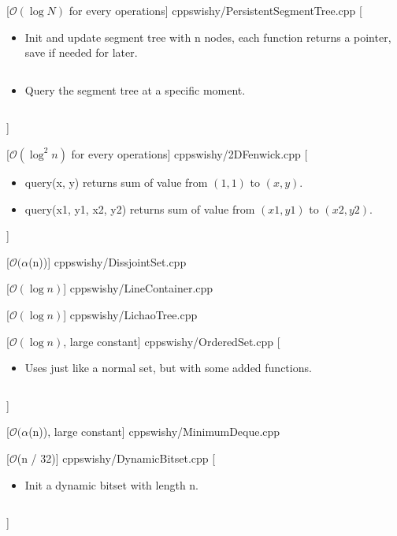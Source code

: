 \documentclass[10pt,a4paper,oneside,twocolumn]{article}
\begin{document}
[$\mathcal{O}(\log N)$ for every operations]
{cpp}{swishy/PersistentSegmentTree.cpp}
[
    \begin{itemize}
        \item Init and update segment tree with n nodes, each function returns a pointer, save if needed for later. \inputminted{cpp}{swishy/examples/PersistentSegmentTree1.cpp}
        \item Query the segment tree at a specific moment. \inputminted{cpp}{swishy/examples/PersistentSegmentTree2.cpp}
    \end{itemize}
]

[$\mathcal{O}(\log^2 n)$ for every operations]
{cpp}{swishy/2DFenwick.cpp}
[
    \begin{itemize}
        \item query(x, y) returns sum of value from $(1, 1)$ to $(x, y)$.
        \item query(x1, y1, x2, y2) returns sum of value from $(x1, y1)$ to $(x2, y2)$.
    \end{itemize}
]

[$\mathcal{O}(\alpha$(n))]
{cpp}{swishy/DissjointSet.cpp}

[$\mathcal{O}(\log n)$]
{cpp}{swishy/LineContainer.cpp}

[$\mathcal{O}(\log n)$]
{cpp}{swishy/LichaoTree.cpp}

[$\mathcal{O}(\log n)$, large constant]
{cpp}{swishy/OrderedSet.cpp}
[
    \begin{itemize}
        \item Uses just like a normal set, but with some added functions. \inputminted{cpp}{swishy/examples/OrderedSet.cpp}
    \end{itemize}
]

[$\mathcal{O}(\alpha$(n)), large constant]
{cpp}{swishy/MinimumDeque.cpp}

[$\mathcal{O}$(n / 32)]
{cpp}{swishy/DynamicBitset.cpp}
[
    \begin{itemize}
        \item Init a dynamic bitset with length n. \inputminted{cpp}{swishy/examples/DynamicBitset.cpp}
    \end{itemize}
]
\end{document}
